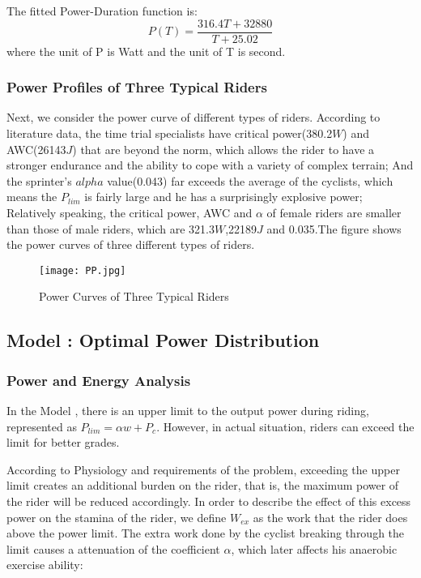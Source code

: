 \documentclass{mcmthesis}
\begin{document}
The fitted Power-Duration function is:
\begin{equation}
	P(T)=\frac{316.4T+32880}{T+25.02}
\end{equation}
where the unit of P is Watt and the unit of T is second.




\subsubsection{Power Profiles of Three Typical Riders}

\qquad
	Next, we consider the power curve of different types of riders. According to literature data, the time trial specialists have critical power(380.2$W$) and AWC(26143$J$) that are beyond the norm, which allows the rider to have a stronger endurance and the ability to cope with a variety of complex terrain; And the sprinter's $alpha$ value(0.043) far exceeds the average of the cyclists, which means the $P_{lim}$ is fairly large and he has a surprisingly explosive power; Relatively speaking, the critical power, AWC and $\alpha$ of female riders are smaller than those of male riders, which are 321.3$W$,22189$J$ and 0.035.The figure shows the power curves of three different types of riders.
\newpage
\begin{figure}[h]
	\centering
	\texttt{[image: PP.jpg]}
	\caption{Power Curves of Three Typical Riders} 
\end{figure}










\subsection{Model \uppercase\expandafter{}: Optimal Power Distribution}

\subsubsection{Power and Energy Analysis}
\qquad
In the Model \uppercase\expandafter{}, there is an upper limit to the output power during riding, represented as $P_{lim}=\alpha w+P_c$. However, in actual situation, riders can exceed the limit for better grades. 

According to Physiology and requirements of the problem, exceeding the upper limit creates an additional burden on the rider, that is, the maximum power of the rider will be reduced accordingly. In order to describe the effect of this excess power on the stamina of the rider, we define $W_{ex}$ as the work that the rider does above the power limit. The extra work done by the cyclist breaking through the limit causes a attenuation of the coefficient $\alpha$, which later affects his anaerobic exercise ability:
\end{document}
